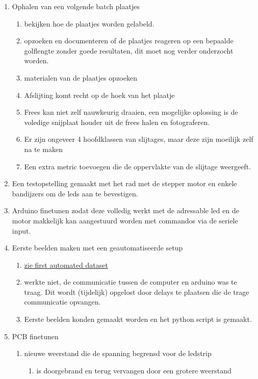 \documentclass{scrartcl}
\begin{document}
\begin{enumerate}[1]
\item Ophalen van een volgende batch plaatjes
	\begin{enumerate}[a]
	\item bekijken hoe de plaatjes worden gelabeld. 
	\item opzoeken en documenteren of de plaatjes reageren op een bepaalde golflengte zonder goede resultaten, dit moet nog verder onderzocht worden.
	\item materialen van de plaatjes opzoeken
	\item Afslijting komt recht op de hoek van het plaatje
	\item Frees kan niet zelf nauwkeurig draaien, een mogelijke oplossing is de voledige snijplaat houder uit de frees halen en fotograferen.
	\item Er zijn ongeveer 4 hoofdklassen van slijtages, maar deze zijn moeilijk zelf na te maken
	\item Een extra metric toevoegen die de oppervlakte van de slijtage weergeeft. 
	\end{enumerate}
\item Een testopstelling gemaakt met het rad met de stepper motor en enkele bandijzers om de leds aan te bevestigen.
\item Arduino finetunen zodat deze volledig werkt met de adressable led en de motor makkelijk kan aangestuurd worden met commandos via de seriele input.
\item Eerste beelden maken met een geautomatiseerde setup
	\begin{enumerate}[a]
	\item \href{file:///Users/larsdepauw/Documents/Lars.nosync/Documents/School/1Ma%20ing/Masterproef/TWI/code/Vision/Datasets/First_automated/camera_zij_boven_dual_ledstrip/first_test}{zie first automated dataset}
	\item werkte niet, de communicatie tussen de computer en arduino was te traag. Dit wordt (tijdelijk) opgelost door delays te plaatsen die de trage communicatie opvangen. 
	\item Eerste beelden konden gemaakt worden en het python script is gemaakt.
	\end{enumerate}
\item PCB finetunen 
	\begin{enumerate}[a]
	\item nieuwe weerstand die de spanning begrensd voor de ledstrip
		\begin{enumerate}[1]
		\item is doorgebrand en terug vervangen door een grotere weerstand
		\end{enumerate}
	\end{enumerate}
\end{enumerate}
\end{document}
